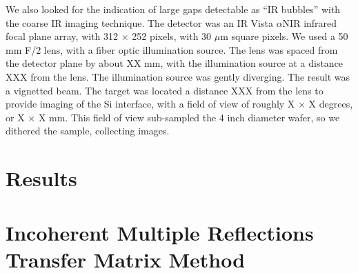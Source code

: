 \documentclass[osajnl,preprint,showpacs,superscriptaddress,12pt]{revtex4-1} %
\begin{document}
We also looked for the indication of large gaps detectable as ``IR bubbles'' \cite{1992JEMat..21..669M} with the coarse IR imaging technique.  The detector was an IR Vista $\alpha$NIR infrared focal plane array, with 312 $\times$ 252 pixels, with 30 $\mu$m square pixels.  We used a 50 mm F/2 lens, with a fiber optic illumination source.  The lens was spaced from the detector plane by about XX mm, with the illumination source at a distance XXX from the lens.  The illumination source was gently diverging.  The result was a vignetted beam.  The target was located a distance XXX from the lens to provide imaging of the Si interface, with a field of view of roughly X $\times$ X degrees, or X $\times$ X mm.  This field of view sub-sampled the 4 inch diameter wafer, so we dithered the sample, collecting images.  



\section{Results}



\appendix
\section{Incoherent Multiple Reflections Transfer Matrix Method}
\label{sec:Append-IMRTMM}
\end{document}
